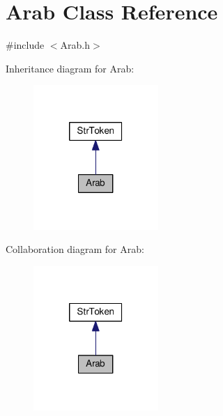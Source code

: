 \hypertarget{class_arab}{\section{Arab Class Reference}
\label{class_arab}
}


{\ttfamily \#include $<$Arab.\-h$>$}



Inheritance diagram for Arab\-:\nopagebreak
\begin{figure}[H]
\begin{center}
\leavevmode
\includegraphics[width=134pt]{class_arab__inherit__graph}
\end{center}
\end{figure}


Collaboration diagram for Arab\-:\nopagebreak
\begin{figure}[H]
\begin{center}
\leavevmode
\includegraphics[width=134pt]{class_arab__coll__graph}
\end{center}
\end{figure}
